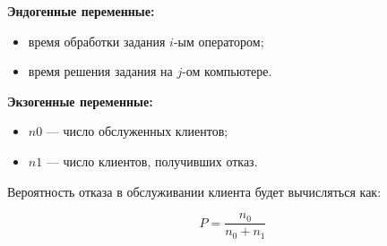 \textbf{Эндогенные переменные:}

\begin{itemize}
	\item время обработки задания $i$-ым оператором;
	\item время решения задания на $j$-ом компьютере.
\end{itemize}

\textbf{Экзогенные переменные:}

\begin{itemize}
	\item $n0$ — число обслуженных клиентов;
	\item $n1$ — число клиентов, получивших отказ.
\end{itemize}

Вероятность отказа в обслуживании клиента будет вычисляться как:

\begin{equation}
	P = \frac{n_0}{n_0 + n_1}
\end{equation}

